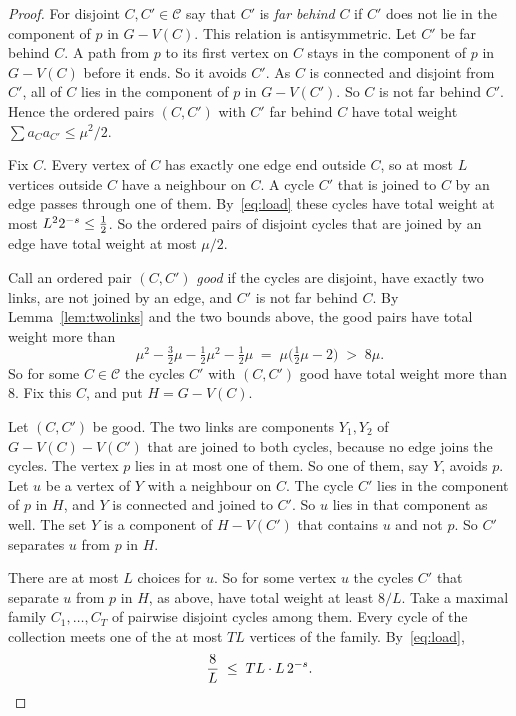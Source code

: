 \begin{proof}
For disjoint $C,C'\in\mathcal C$ say that $C'$ is \emph{far behind} $C$ if $C'$ does not lie in the
component of $p$ in $G-V(C)$. This relation is antisymmetric. Let $C'$ be far behind $C$. A path
from $p$ to its first vertex on $C$ stays in the component of $p$ in $G-V(C)$ before it ends. So it
avoids $C'$. As $C$ is connected and disjoint from $C'$, all of $C$ lies in the component of $p$ in
$G-V(C')$. So $C$ is not far behind $C'$. Hence the ordered pairs $(C,C')$ with $C'$ far behind $C$
have total weight $\sum a_Ca_{C'}\le\mu^{2}/2$.

Fix $C$. Every vertex of $C$ has exactly one edge end outside $C$, so at most $L$ vertices outside
$C$ have a neighbour on $C$. A cycle $C'$ that is joined to $C$ by an edge passes through one of
them. By~\eqref{eq:load} these cycles have total weight at most $L^{2}2^{-s}\le\tfrac12$. So the
ordered pairs of disjoint cycles that are joined by an edge have total weight at most $\mu/2$.

Call an ordered pair $(C,C')$ \emph{good} if the cycles are disjoint, have exactly two links, are
not joined by an edge, and $C'$ is not far behind $C$. By Lemma~\ref{lem:twolinks} and the two
bounds above, the good pairs have total weight more than
\[
  \mu^{2}-\tfrac32\mu-\tfrac12\mu^{2}-\tfrac12\mu\;=\;\mu\bigl(\tfrac12\mu-2\bigr)\;>\;8\mu .
\]
So for some $C\in\mathcal C$ the cycles $C'$ with $(C,C')$ good have total weight more than $8$.
Fix this $C$, and put $H=G-V(C)$.

Let $(C,C')$ be good. The two links are components $Y_1,Y_2$ of $G-V(C)-V(C')$ that are joined to
both cycles, because no edge joins the cycles. The vertex $p$ lies in at most one of them. So one of
them, say $Y$, avoids $p$. Let $u$ be a vertex of $Y$ with a neighbour on $C$. The cycle $C'$ lies
in the component of $p$ in $H$, and $Y$ is connected and joined to $C'$. So $u$ lies in that
component as well. The set $Y$ is a component of $H-V(C')$ that contains $u$ and not $p$. So $C'$
separates $u$ from $p$ in $H$.

There are at most $L$ choices for $u$. So for some vertex $u$ the cycles $C'$ that separate $u$
from $p$ in $H$, as above, have total weight at least $8/L$. Take a maximal family
$C_1,\dots,C_T$ of pairwise disjoint cycles among them. Every cycle of the collection meets one of
the at most $TL$ vertices of the family. By~\eqref{eq:load},
\[
  \frac8L\;\le\;TL\cdot L\,2^{-s}.\qedhere
\]
\end{proof}
